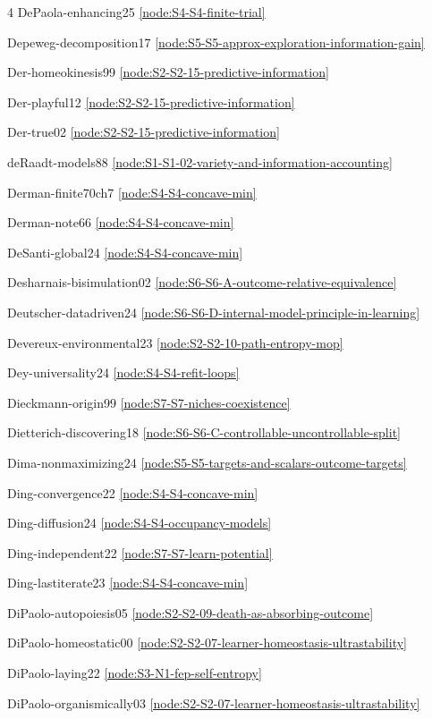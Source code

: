 \documentclass[10pt]{article}
\begin{document}
{\begin{multicols}{4}
DePaola-enhancing25 \hfill \ref{node:S4-S4-finite-trial}\par
Depeweg-decomposition17 \hfill \ref{node:S5-S5-approx-exploration-information-gain}\par
Der-homeokinesis99 \hfill \ref{node:S2-S2-15-predictive-information}\par
Der-playful12 \hfill \ref{node:S2-S2-15-predictive-information}\par
Der-true02 \hfill \ref{node:S2-S2-15-predictive-information}\par
deRaadt-models88 \hfill \ref{node:S1-S1-02-variety-and-information-accounting}\par
Derman-finite70ch7 \hfill \ref{node:S4-S4-concave-min}\par
Derman-note66 \hfill \ref{node:S4-S4-concave-min}\par
DeSanti-global24 \hfill \ref{node:S4-S4-concave-min}\par
Desharnais-bisimulation02 \hfill \ref{node:S6-S6-A-outcome-relative-equivalence}\par
Deutscher-datadriven24 \hfill \ref{node:S6-S6-D-internal-model-principle-in-learning}\par
Devereux-environmental23 \hfill \ref{node:S2-S2-10-path-entropy-mop}\par
Dey-universality24 \hfill \ref{node:S4-S4-refit-loops}\par
Dieckmann-origin99 \hfill \ref{node:S7-S7-niches-coexistence}\par
Dietterich-discovering18 \hfill \ref{node:S6-S6-C-controllable-uncontrollable-split}\par
Dima-nonmaximizing24 \hfill \ref{node:S5-S5-targets-and-scalars-outcome-targets}\par
Ding-convergence22 \hfill \ref{node:S4-S4-concave-min}\par
Ding-diffusion24 \hfill \ref{node:S4-S4-occupancy-models}\par
Ding-independent22 \hfill \ref{node:S7-S7-learn-potential}\par
Ding-lastiterate23 \hfill \ref{node:S4-S4-concave-min}\par
DiPaolo-autopoiesis05 \hfill \ref{node:S2-S2-09-death-as-absorbing-outcome}\par
DiPaolo-homeostatic00 \hfill \ref{node:S2-S2-07-learner-homeostasis-ultrastability}\par
DiPaolo-laying22 \hfill \ref{node:S3-N1-fep-self-entropy}\par
DiPaolo-organismically03 \hfill \ref{node:S2-S2-07-learner-homeostasis-ultrastability}\par

\end{multicols}}
\end{document}
